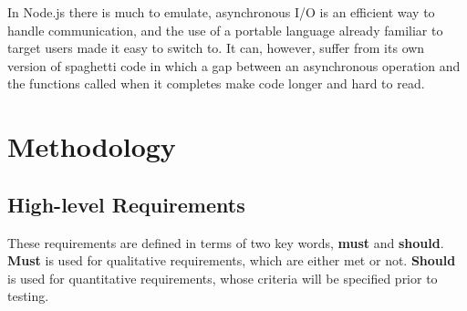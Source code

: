 \documentclass{article}
\begin{document}
In Node.js there is much to emulate, asynchronous I/O is an efficient way to handle communication, and the use of a portable language already familiar to target users made it easy to switch to. It can, however, suffer from its own version of spaghetti code in which a gap between an asynchronous operation and the functions called when it completes make code longer and hard to read.

\section{Methodology}
\subsection{High-level Requirements}
These requirements are defined in terms of two key words, \textbf{must} and \textbf{should}. \textbf{Must} is used for qualitative requirements, which are either met or not. \textbf{Should} is used for quantitative requirements, whose criteria will be specified prior to testing.
\end{document}
